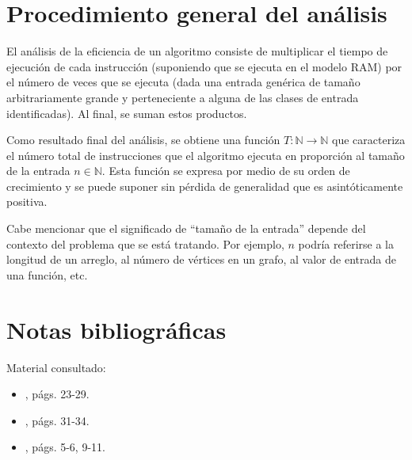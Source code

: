 \section{Procedimiento general del análisis}

El análisis de la eficiencia de un algoritmo consiste de multiplicar
el tiempo de ejecución de cada instrucción (suponiendo que se ejecuta
en el modelo RAM) por el número de veces que se ejecuta (dada una
entrada genérica de tamaño arbitrariamente grande y perteneciente
a alguna de las clases de entrada identificadas). Al final, se suman
estos productos. 

Como resultado final del análisis, se obtiene una función $T:\mathbb{N}\to\mathbb{N}$
que caracteriza el número total de instrucciones que el algoritmo ejecuta
en proporción al tamaño de la entrada $n\in\mathbb{N}$. Esta función
se expresa por medio de su orden de crecimiento y se puede suponer
sin pérdida de generalidad que es asintóticamente positiva. 

Cabe mencionar que el significado de ``tamaño de la entrada'' depende
del contexto del problema que se está tratando. Por ejemplo, $n$
podría referirse a la longitud de un arreglo, al número de vértices
en un grafo, al valor de entrada de una función, etc.

\section*{Notas bibliográficas}

Material consultado:
\begin{itemize}
    \item \textcite{cormen_introduction_2009}, págs. 23-29.
    \item \textcite{skiena_algorithm_2011}, págs. 31-34.
    \item \textcite{goodrich_algorithm_2001}, págs. 5-6, 9-11.
\end{itemize}

